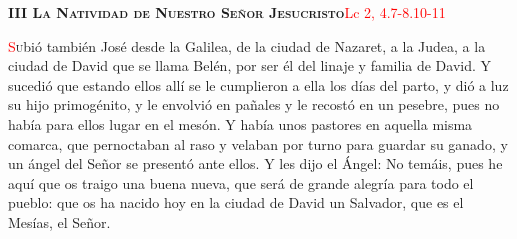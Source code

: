 \noindent\textbf{\textsc{III La Natividad de Nuestro Señor Jesucristo}}\hfill\textcolor{red}{Lc 2, 4.7-8.10-11}

\vspace{0.25em}

\lettrine[lines=2]{\textcolor{red}{S}}ubió también José desde la Galilea, de la ciudad de Nazaret, a la Judea, a la ciudad de David que se llama Belén, por ser él del linaje y familia de David.
Y sucedió que estando ellos allí se le cumplieron a ella los días del parto, y dió a luz su hijo primogénito, y le envolvió en pañales y le recostó en un pesebre, 
pues no había para ellos lugar en el mesón. Y había unos pastores en aquella misma comarca, que pernoctaban al raso y velaban por turno para guardar su ganado, 
y un ángel del Señor se presentó ante ellos. Y les dijo el Ángel: No temáis, pues he aquí que os traigo una buena nueva, que será de grande alegría para todo el pueblo: 
que os ha nacido hoy en la ciudad de David un Salvador, que es el Mesías, el Señor.